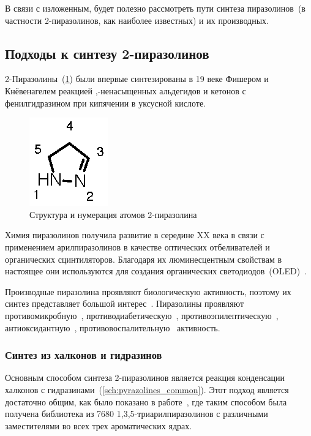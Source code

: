 В связи с изложенным, будет полезно рассмотреть пути синтеза пиразолинов~(в частности 2-пиразолинов, как наиболее известных) и их производных. 
\pagebreak

\subsection{Подходы к синтезу 2-пиразолинов}
2-Пиразолины~(\ref{fig:pyrazoline_structure}) были впервые синтезированы в 19 веке Фишером и Кнёвенагелем реакцией \chemalpha,\chembeta-ненасыщенных альдегидов и кетонов с фенилгидразином при кипячении в уксусной кислоте.

\begin{figure}[h!]
    \centering
    \includegraphics{sections/literature/img/pyrazoline_structure.eps}
    \caption{Структура и нумерация атомов 2-пиразолина}
    \label{fig:pyrazoline_structure}
\end{figure}

Химия пиразолинов получила развитие в середине XX века в связи с применением арилпиразолинов в качестве оптических отбеливателей и органических сцинтиляторов.
Благодаря их люминесцентным свойствам в настоящее они используются для создания органических светодиодов~(OLED)~\cite{Stakhira2012,Ramkumar2015,Vandana2016}.

Производные пиразолина проявляют биологическую активность, поэтому их синтез представляет большой интерес~\cite{Salian2018, Singh2018,Korablina2016}.
Пиразолины проявляют противомикробную~\cite{Hassan2013}, противодиабетическую~\cite{Ahn2004}, противоэпилептическую~\cite{GunizKucukguzel2000}, антиоксидантную~\cite{Jagadish2013}, противовоспалительную~\cite{Barsoum2006} активность.

\subsubsection{Синтез из халконов и гидразинов}

Основным способом синтеза 2-пиразолинов является реакция конденсации халконов с гидразинами~(\ref{sch:pyrazolines_common}).
Этот подход является достаточно общим, как было показано в работе~\cite{Powers1998}, где таким способом была получена библиотека из \num{7680} 1,3,5-триарилпиразолинов с различными заместителями во всех трех ароматических ядрах.

